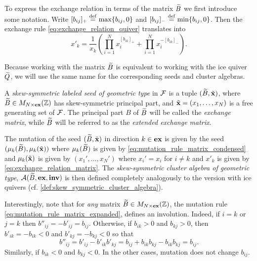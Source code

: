 To express the exchange relation in terms of the matrix $\widetilde{B}$ we first introduce some
notation. Write $[b_{ij}]_{+} \overset{\mathrm{def}}{=} \max\{b_{ij}, 0\}$ and $[b_{ij}]_{-} \overset{\mathrm{def}}{=}
	\min\{b_{ij}, 0\}$. Then the exchange rule \cref{eq:exchange_relation_quiver}
translates into
\begin{equation}\label{eq:exchange_relation_matrix}
	x'_k = \frac{1}{x_k}\left(\prod_{i=1}^N x_i^{[b_{ik}]_{+}} + \prod_{i=1}^{N} x_i^{-[b_{ik}]_{-}}\right).
\end{equation}

Because working with the matrix $\widetilde{B}$ is equivalent to working with the ice quiver
$\widetilde{Q}$, we will use the same name for the corresponding seeds and cluster algebras.
\begin{definition}

	A \emph{skew-symmetric labeled seed of geometric type} in $\mathcal{F}$ is a tuple $(\widetilde{B}, \tilde{\mathbf{x}})$, where $\widetilde{B} \in M_{N \times
				\mathbf{ex}}(\mathbb{Z})$ has skew-symmetric principal part, and $\tilde{\mathbf{x}} = (x_1, \dots, x_N)$ is a free
	generating set of $\mathcal{F}$. The principal part $B$ of $\widetilde{B}$ will be called the
	\emph{exchange matrix}, while $\widetilde{B}$ will be referred to as the
	\emph{extended exchange matrix}.

	The mutation of the seed $(\widetilde{B}, \tilde{\mathbf{x}})$ in direction $k \in \mathbf{ex}$ is given by the seed
	$(\mu_k(\widetilde{B}), \mu_k(\tilde{\mathbf{x}}))$ where $\mu_k(\widetilde{B})$ is given by
	\cref{eq:mutation_rule_matrix_condensed} and $\mu_k(\tilde{\mathbf{x}})$ is given by $(x_1', \dots,
		x_N')$ where $x_i' = x_i$ for $i\neq k$ and $x'_k$ is given by
	\cref{eq:exchange_relation_matrix}. The \emph{skew-symmetric cluster algebra of
		geometric type}, $\mathcal{A}(\widetilde{B},
		\mathbf{ex}, \mathbf{inv})$ is then defined completely
	analogously to the version with ice quivers (cf. \cref{def:skew_symmetric_cluster_algebra}).
\end{definition}

Interestingly, note that for \emph{any} matrix $\widetilde{B} \in M_{N\times \mathbf{ex}}(\mathbb{Z})$, the
mutation rule \cref{eq:mutation_rule_matrix_expanded}, defines an involution. Indeed,
if $i = k$ or $j = k$ then $b''_{ij} = -b'_{ij} = b_{ij}$. Otherwise, if $b_{ik} > 0$
and $b_{kj} >0$, then $b'_{ik} = -b_{ik} < 0$ and $b'_{kj} = -b_{kj} < 0$ so that
\begin{equation*}
	b''_{ij} = b'_{ij} - b'_{ik}b'_{kj} = b_{ij} + b_{ik}b_{kj} - b_{ik}b_{kj} = b_{ij}.
\end{equation*}
%
Similarly, if $b_{ik} < 0$ and $b_{kj} < 0$. In the other cases, mutation does not
change $b_{ij}$.

